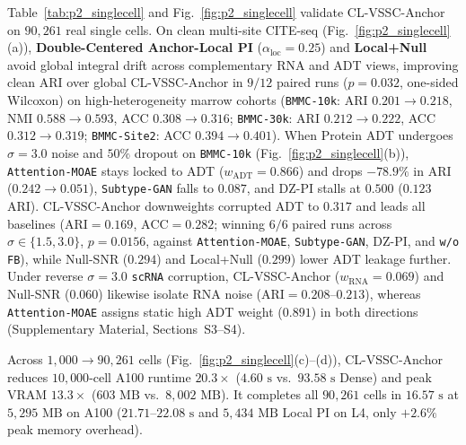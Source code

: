 \documentclass[journal]{IEEEtran}
\begin{document}
Table~\ref{tab:p2_singlecell} and Fig.~\ref{fig:p2_singlecell} validate CL-VSSC-Anchor on $90{,}261$ real single cells. On clean multi-site CITE-seq (Fig.~\ref{fig:p2_singlecell}(a)), \textbf{Double-Centered Anchor-Local PI} ($\alpha_{\mathrm{loc}}=0.25$) and \textbf{Local+Null} avoid global integral drift across complementary RNA and ADT views, improving clean ARI over global CL-VSSC-Anchor in $9/12$ paired runs ($p = 0.032$, one-sided Wilcoxon) on high-heterogeneity marrow cohorts (\texttt{BMMC-\allowbreak 10k}: ARI $0.201 \rightarrow 0.218$, NMI $0.588 \rightarrow 0.593$, ACC $0.308 \rightarrow 0.316$; \texttt{BMMC-\allowbreak 30k}: ARI $0.212 \rightarrow 0.222$, ACC $0.312 \rightarrow 0.319$; \texttt{BMMC-\allowbreak Site2}: ACC $0.394 \rightarrow 0.401$). When Protein ADT undergoes $\sigma=3.0$ noise and $50\%$ dropout on \texttt{BMMC-\allowbreak 10k} (Fig.~\ref{fig:p2_singlecell}(b)), \texttt{Attention-\allowbreak MOAE} stays locked to ADT ($w_{\mathrm{ADT}}=0.866$) and drops $-78.9\%$ in ARI ($0.242 \rightarrow 0.051$), \texttt{Subtype-\allowbreak GAN} falls to $0.087$, and DZ-PI stalls at $0.500$ ($0.123$ ARI). CL-VSSC-Anchor downweights corrupted ADT to $0.317$ and leads all baselines ($\mathrm{ARI}=0.169$, $\mathrm{ACC}=0.282$; winning $6/6$ paired runs across $\sigma \in \{1.5, 3.0\}$, $p = 0.0156$, against \texttt{Attention-\allowbreak MOAE}, \texttt{Subtype-\allowbreak GAN}, DZ-PI, and \texttt{w/o FB}), while Null-SNR ($0.294$) and Local+Null ($0.299$) lower ADT leakage further. Under reverse $\sigma=3.0$ \texttt{scRNA} corruption, CL-VSSC-Anchor ($w_{\mathrm{RNA}}=0.069$) and Null-SNR ($0.060$) likewise isolate RNA noise ($\mathrm{ARI}=0.208\text{--}0.213$), whereas \texttt{Attention-\allowbreak MOAE} assigns static high ADT weight ($0.891$) in both directions (Supplementary Material, Sections~S3--S4).

Across $1{,}000 \rightarrow 90{,}261$ cells (Fig.~\ref{fig:p2_singlecell}(c)--(d)), CL-VSSC-Anchor reduces $10{,}000$-cell A100 runtime $20.3\times$ ($4.60\text{ s}$ vs.\ $93.58\text{ s}$ Dense) and peak VRAM $13.3\times$ ($603\text{ MB}$ vs.\ $8{,}002\text{ MB}$). It completes all $90{,}261$ cells in $16.57\text{ s}$ at $5{,}295\text{ MB}$ on A100 ($21.71\text{--}22.08\text{ s}$ and $5{,}434\text{ MB}$ Local PI on L4, only $+2.6\%$ peak memory overhead).
\end{document}
